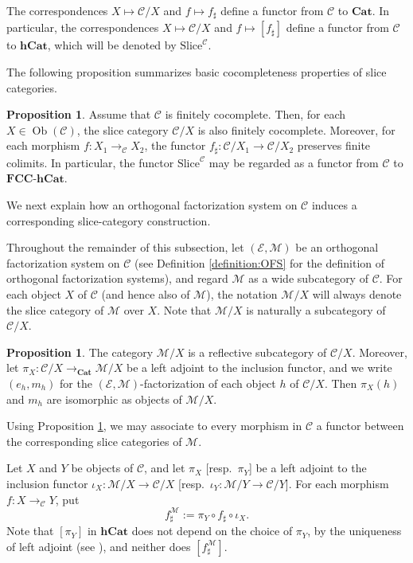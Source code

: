 \documentclass[12pt, a4paper]{amsart}
\theoremstyle{definition}
\newtheorem{proposition}[theorem]{Proposition}
\newcommand{\Ob}{\mathop{\mathrm{Ob}}\nolimits}
\newcommand{\FCChCat}{\mathbf{FCC}\text{-}\mathbf{hCat}}
\newcommand{\Cat}{{\mathbf{Cat}}}
\newcommand{\hCat}{{\mathbf{hCat}}}
\newcommand{\CSlice}{\mathrm{Slice}^\mathcal{C}}
\begin{document}
The correspondences
$X\mapsto\mathcal{C}/X$ and 
$f\mapsto f_\sharp$
define a functor from $\mathcal{C}$ to $\Cat$.
In particular, the correspondences $X\mapsto\mathcal{C}/X$ and 
$f\mapsto[f_\sharp]$
define a functor from $\mathcal{C}$ to $\hCat$, which will be denoted by
$\CSlice$.

The following proposition summarizes basic cocompleteness properties of
slice categories.

\begin{proposition}\label{proposition:CXFCC}
Assume that $\mathcal{C}$ is finitely cocomplete.
Then, for each $X\in\Ob(\mathcal{C})$, the slice category
$\mathcal{C}/X$ is also finitely cocomplete.
Moreover, for each morphism
$f:X_1\rightarrow_{\mathcal{C}}X_2$,
the functor
$f_\sharp:\mathcal{C}/X_1\rightarrow\mathcal{C}/X_2$
preserves finite colimits.
In particular, the functor $\CSlice$ may be regarded as a functor from
$\mathcal{C}$ to $\FCChCat$.
\end{proposition}

We next explain how an orthogonal factorization system on $\mathcal{C}$
induces a corresponding slice-category construction.

Throughout the remainder of this subsection, let
$(\mathcal{E},\mathcal{M})$
be an orthogonal factorization system on $\mathcal{C}$ (see Definition \ref{definition:OFS} for the definition of orthogonal factorization systems), and regard
$\mathcal{M}$ as a wide subcategory of $\mathcal{C}$.
For each object $X$ of $\mathcal{C}$ (and hence also of $\mathcal{M}$),
the notation $\mathcal{M}/X$ will always denote the slice category of
$\mathcal{M}$ over $X$.
Note that $\mathcal{M}/X$ is naturally a subcategory of $\mathcal{C}/X$.

\begin{proposition}\label{proposition:MXCXreflective}
The category $\mathcal{M}/X$ is a reflective subcategory of
$\mathcal{C}/X$.
Moreover, let
$\pi_X:\mathcal{C}/X\rightarrow_{\Cat}\mathcal{M}/X$
be a left adjoint to the inclusion functor, 
and we write 
$(e_h,m_h)$ for the $(\mathcal{E},\mathcal{M})$-factorization of each object $h$ of $\mathcal{C}/X$.
Then $\pi_X(h)$ and $m_h$ are isomorphic as objects of $\mathcal{M}/X$.
\end{proposition}


Using Proposition \ref{proposition:MXCXreflective}, we may associate to
every morphism in $\mathcal{C}$ a functor between the corresponding slice
categories of $\mathcal{M}$.

Let $X$ and $Y$ be objects of $\mathcal{C}$, and let
$\pi_X$ [resp.~$\pi_Y$] be a left adjoint to the inclusion functor $\iota_X : \mathcal{M}/X \rightarrow \mathcal{C}/X$ [resp.~$\iota_Y : \mathcal{M}/Y \rightarrow \mathcal{C}/Y$].
For each morphism
$f:X\rightarrow_{\mathcal{C}}Y$,
put
\[
f_\sharp^{\mathcal{M}}
:=
\pi_Y \circ f_\sharp \circ \iota_X.
\]
Note that $[\pi_Y]$ in $\hCat$ does not depend on the choice of $\pi_Y$, by the uniqueness of left adjoint (see \cite[Proposition 4.3.1]{Riehl2016category}), and neither does $[f_\sharp^{\mathcal{M}}]$.
\end{document}
